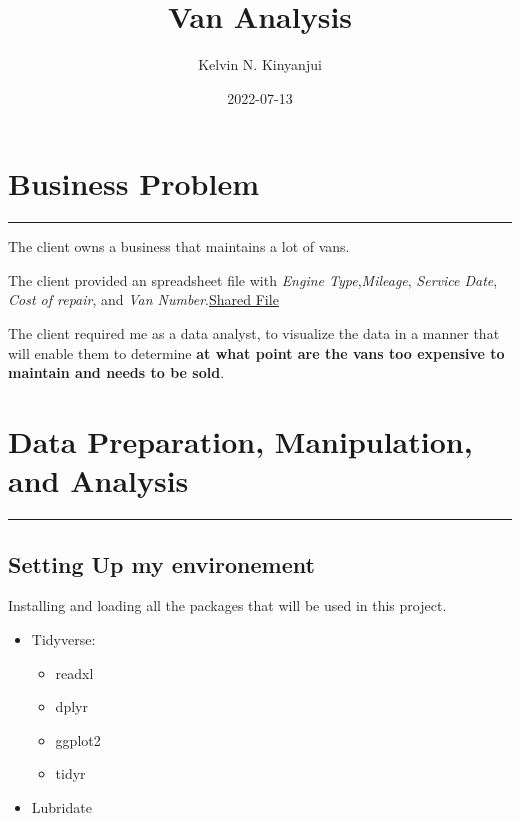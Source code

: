 \documentclass[
]{article}
\title{Van Analysis}
\author{Kelvin N. Kinyanjui}
\date{2022-07-13}
\providecommand{\tightlist}{%
  \setlength{\itemsep}{0pt}\setlength{\parskip}{0pt}}
\begin{document}
\maketitle

\hypertarget{business-problem}{%
\section{Business Problem}\label{business-problem}}

\begin{center}\rule{0.5\linewidth}{0.5pt}\end{center}

The client owns a business that maintains a lot of vans.

The client provided an spreadsheet file with \emph{Engine
Type},\emph{Mileage}, \emph{Service Date}, \emph{Cost of repair}, and
\emph{Van
Number}.\href{https://docs.google.com/spreadsheets/d/11zPiOVSR7AlZEzn0jGHPik0ISszIb5w7rFvrMT7P8pQ/edit?usp=sharing}{Shared
File}

The client required me as a data analyst, to visualize the data in a
manner that will enable them to determine \textbf{at what point are the
vans too expensive to maintain and needs to be sold}.

\hypertarget{data-preparation-manipulation-and-analysis}{%
\section{Data Preparation, Manipulation, and
Analysis}\label{data-preparation-manipulation-and-analysis}}

\begin{center}\rule{0.5\linewidth}{0.5pt}\end{center}

\hypertarget{setting-up-my-environement}{%
\subsection{Setting Up my
environement}\label{setting-up-my-environement}}

Installing and loading all the packages that will be used in this
project.

\begin{itemize}
\tightlist
\item
  Tidyverse:

  \begin{itemize}
  \tightlist
  \item
    readxl
  \item
    dplyr
  \item
    ggplot2
  \item
    tidyr\\
  \end{itemize}
\item
  Lubridate
\end{itemize}
\end{document}
